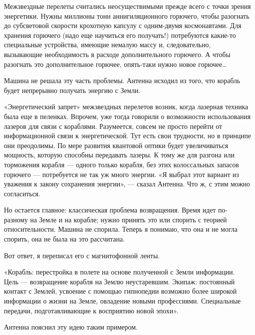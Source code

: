    Межзвездные перелеты считались неосуществимыми прежде всего с точки зрения
   энергетики. Нужны миллионы тонн аннигиляционного горючего, чтобы разогнать
   до субсветовой скорости крохотную капсулу с одним-двумя космонавтами.  Для
   хранения горючего (надо еще научиться его получать!) потребуются  какие-то
   специальные устройства, имеющие немалую массу и, следовательно, вызывающие
   необходимость в расходе  дополнительного горючего. А  чтобы разогнать  это
   дополнительное горючее, опять-таки нужно новое горючее…

   Машина не решала эту часть проблемы. Антенна исходил из того, что  корабль
   будет непрерывно получать энергию с Земли.

   «Энергетический  запрет»  межзвездных  перелетов  возник,  когда  лазерная
   техника была еще  в пеленках.  Впрочем, уже тогда  говорили о  возможности
   использования лазеров для связи с кораблями. Разумеется, совсем не  просто
   перейти от информационной связи к энергетической. Тут есть свои трудности,
   но в  принципе они  преодолимы. По  мере развития  квантовой оптики  будет
   увеличиваться мощность, которую способны передавать лазеры. К тому же  для
   разгона  или  торможения  корабля  —  одного  только  корабля,  без   этих
   колоссальных запасов горючего —  потребуется не так  уж много энергии.  «Я
   выбрал этот вариант  из уважения  к закону сохранения  энергии», —  сказал
   Антенна. Что ж, с этим можно согласиться.

   Но  остается  главное:  классическая  проблема  возвращения.  Время   идет
   по-разному на Земле и на корабле; нужно принять это или спорить с  теорией
   относительности. Машина не спорила. Теперь я  понимаю, что она и не  могла
   спорить, она не была на это рассчитана.

   Вот ответ, я переписал его с магнитофонной ленты.

   «Корабль: перестройка в  полете на основе  полученной с Земли  информации.
   Цель —  возвращение  корабля  на Землю  неустаревшим.  Экипаж:  постоянный
   контакт с Землей,  усвоение с  помощью гипнопедии  возможно более  широкой
   информации о  жизни на  Земле, овладение  новыми профессиями.  Специальные
   передачи, подготавливающие к восприятию новой эпохи».

   Антенна пояснил эту идею таким примером.

